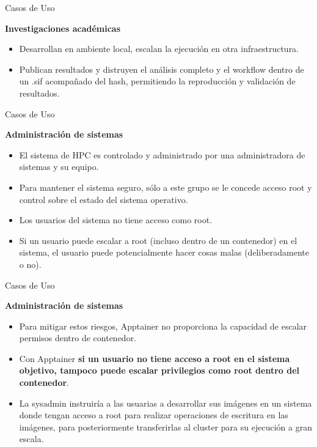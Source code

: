 \documentclass[11pt]{beamer}
\begin{document}
\begin{frame}{Casos de Uso}

\textbf{Investigaciones académicas}

\begin{itemize}
	\item Desarrollan en ambiente local, escalan la ejecución en otra infraestructura.
	\item Publican resultados y distruyen el análisis completo y el workflow dentro de un .sif acompañado del hash, permitiendo la reproducción y validación de resultados. 
\end{itemize}
\end{frame}

\begin{frame}{Casos de Uso}

\textbf{Administración de sistemas}

\begin{itemize}
	\item El sistema de HPC es controlado y administrado por una administradora de sistemas y su equipo. 
	\item Para mantener el sistema seguro, sólo a este grupo se le concede acceso root y control sobre el estado del sistema operativo.
	\item Los usuarios del sistema no tiene acceso como root.
	\item Si un usuario puede escalar a root (incluso dentro de un contenedor) en el sistema, el usuario puede potencialmente hacer cosas malas (deliberadamente o no). 
\end{itemize}
\end{frame}

\begin{frame}{Casos de Uso}

\textbf{Administración de sistemas}

\begin{itemize}
	\item Para mitigar estos riesgos, Apptainer no proporciona la capacidad de escalar permisos dentro de contenedor.
	\item Con Apptainer \textbf{si un usuario no tiene acceso a root en el sistema objetivo, tampoco puede escalar privilegios como root dentro del contenedor}. 
	\item La sysadmin instruiría  a las usuarias a desarrollar sus imágenes en un sistema donde tengan acceso a root para realizar operaciones de escritura en las imágenes, para posteriormente transferirlas al cluster para su ejecución a gran escala.
\end{itemize}
\end{frame}
\end{document}

